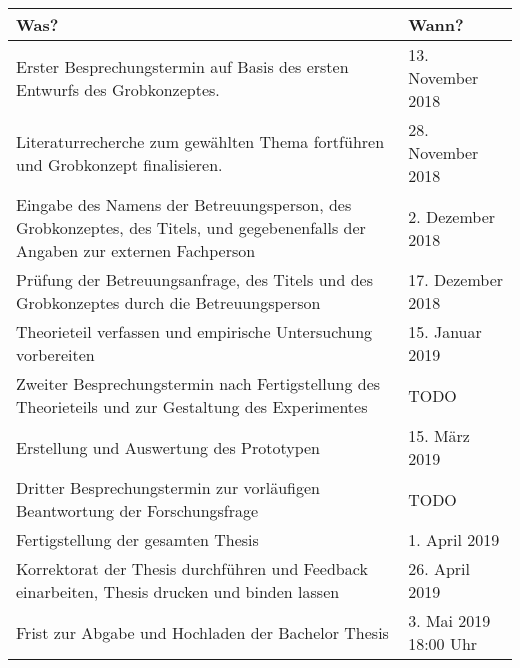 \documentclass{hwz}
\begin{document}
\begin{center}
    \renewcommand{\arraystretch}{1.25}
    \setlength{\tabcolsep}{15pt}
    \begin{tabular}{ | p{8cm} | l |}
    \hline
    \rowcolor{ccc} Was? & Wann? \\ \hline
    Erster Besprechungstermin auf Basis des ersten Entwurfs des Grobkonzeptes. & 13. November 2018 \\ \hline
    
    Literaturrecherche zum gewählten Thema fortführen und Grobkonzept finalisieren. & 28. November 2018 \\ \hline
    
    \rowcolor{orange} Eingabe des Namens der Betreuungsperson, des Grobkonzeptes, des Titels, und gegebenenfalls der Angaben zur externen Fachperson & 2. Dezember 2018 \\ \hline
    
    Prüfung der Betreuungsanfrage, des Titels und des Grobkonzeptes durch die Betreuungsperson & 17. Dezember 2018 \\ \hline
    
    Theorieteil verfassen und empirische Untersuchung vorbereiten & 15. Januar 2019 \\ \hline
    
    Zweiter Besprechungstermin nach Fertigstellung des Theorieteils und zur Gestaltung des Experimentes & TODO \\ \hline
    
    Erstellung und Auswertung des Prototypen & 15. März 2019 \\ \hline
    
    Dritter Besprechungstermin zur vorläufigen Beantwortung der Forschungsfrage & TODO \\ \hline
    
    Fertigstellung der gesamten Thesis & 1. April 2019 \\ \hline
    
    Korrektorat der Thesis durchführen und Feedback einarbeiten, Thesis drucken und binden lassen & 26. April 2019 \\ \hline
    
    \rowcolor{orange} Frist zur Abgabe und Hochladen der Bachelor Thesis & 3. Mai 2019 18:00 Uhr \\ \hline
    
    \end{tabular}
\end{center}


\newpage
\end{document}
